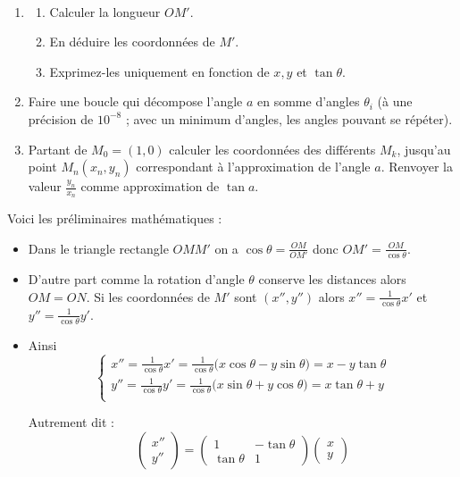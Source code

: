 \documentclass[class=report,crop=false]{standalone}
\begin{document}
\begin{tp}~
\begin{enumerate}
  \item
  \begin{enumerate}
    \item Calculer la longueur $OM'$.
    \item En déduire les coordonnées de $M'$.
    \item Exprimez-les uniquement en fonction de $x,y$ et $\tan \theta$.
  \end{enumerate}

  \item Faire une boucle qui décompose l'angle $a$ en somme d'angles $\theta_i$ (à une précision de $10^{-8}$ ;
  avec un minimum d'angles, les angles pouvant se répéter).

  \item Partant de $M_0 = (1,0)$ calculer les coordonnées des différents $M_k$,
  jusqu'au point $M_n(x_n,y_n)$ correspondant à l'approximation de l'angle $a$.
  Renvoyer la valeur $\frac{y_n}{x_n}$ comme approximation de $\tan a$.
\end{enumerate}
\end{tp}


Voici les préliminaires mathématiques :
  \begin{itemize}
    \item Dans le triangle rectangle $OMM'$ on a $\cos \theta = \frac{OM}{OM'}$ donc $OM' = \frac{OM}{\cos \theta}$.

    \item D'autre part comme la rotation d'angle $\theta$ conserve les distances alors $OM=ON$.
    Si les coordonnées de $M'$ sont $(x'',y'')$ alors $x''= \frac{1}{\cos \theta} x'$ et
    $y''= \frac{1}{\cos \theta} y'$.

    \item Ainsi
$$ \left\{ \begin{array}{l}
        x'' = \frac{1}{\cos \theta} x' = \frac{1}{\cos \theta} \big( x \cos \theta - y \sin \theta \big) = x - y \tan \theta \\
        y'' = \frac{1}{\cos \theta} y' = \frac{1}{\cos \theta} \big(x \sin \theta + y \cos \theta \big) =x \tan \theta + y \\
        \end{array}
\right. $$

Autrement dit :
$$\begin{pmatrix} x'' \\ y'' \end{pmatrix}
= \begin{pmatrix} 1 & - \tan \theta \\ \tan \theta & 1 \end{pmatrix}
\begin{pmatrix} x \\y \end{pmatrix}$$
   \end{itemize}
\end{document}
